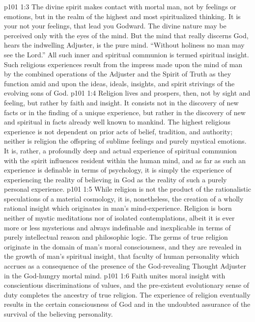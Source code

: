 \vs p101 1:3 The divine spirit makes contact with mortal man, not by feelings or emotions, but in the realm of the highest and most spiritualized thinking. It is your  not your feelings, that lead you Godward. The divine nature may be perceived only with the eyes of the mind. But the mind that really discerns God, hears the indwelling Adjuster, is the pure mind. “Without holiness no man may see the Lord.” All such inner and spiritual communion is termed spiritual insight. Such religious experiences result from the impress made upon the mind of man by the combined operations of the Adjuster and the Spirit of Truth as they function amid and upon the ideas, ideals, insights, and spirit strivings of the evolving sons of God.
\vs p101 1:4 Religion lives and prospers, then, not by sight and feeling, but rather by faith and insight. It consists not in the discovery of new facts or in the finding of a unique experience, but rather in the discovery of new and spiritual  in facts already well known to mankind. The highest religious experience is not dependent on prior acts of belief, tradition, and authority; neither is religion the offspring of sublime feelings and purely mystical emotions. It is, rather, a profoundly deep and actual experience of spiritual communion with the spirit influences resident within the human mind, and as far as such an experience is definable in terms of psychology, it is simply the experience of experiencing the reality of believing in God as the reality of such a purely personal experience.
\vs p101 1:5 \pc While religion is not the product of the rationalistic speculations of a material cosmology, it is, nonetheless, the creation of a wholly rational insight which originates in man’s mind\hyp{}experience. Religion is born neither of mystic meditations nor of isolated contemplations, albeit it is ever more or less mysterious and always indefinable and inexplicable in terms of purely intellectual reason and philosophic logic. The germs of true religion originate in the domain of man’s moral consciousness, and they are revealed in the growth of man’s spiritual insight, that faculty of human personality which accrues as a consequence of the presence of the God\hyp{}revealing Thought Adjuster in the God\hyp{}hungry mortal mind.
\vs p101 1:6 Faith unites moral insight with conscientious discriminations of values, and the pre\hyp{}existent evolutionary sense of duty completes the ancestry of true religion. The experience of religion eventually results in the certain consciousness of God and in the undoubted assurance of the survival of the believing personality.
